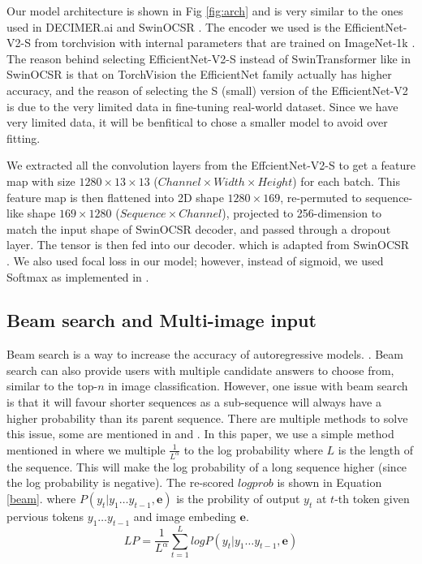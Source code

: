 \documentclass[12pt]{article}
\begin{document}
Our model architecture is shown in Fig \ref{fig:arch} and is very similar to the ones used in DECIMER.ai \autocite{decimer} and SwinOCSR \autocite{swinocsr}. The encoder we used is the EfficientNet-V2-S \autocite{effv2} from torchvision \autocite{torchvision2016} with internal parameters that are trained on ImageNet-1k \autocite{imagenet}. The reason behind selecting EfficientNet-V2-S instead of SwinTransformer like in SwinOCSR \autocite{swinocsr} is that on TorchVision the EfficientNet family actually has higher accuracy, and the reason of selecting the S (small) version of the EfficientNet-V2 is due to the very limited data in fine-tuning real-world dataset. Since we have very limited data, it will be benfitical to chose a smaller model to avoid over fitting. 

We extracted all the convolution layers from the EffcientNet-V2-S to get a feature map with size $1280\times13\times13$ ($Channel \times Width \times Height$)  for each batch. This feature map is then flattened into 2D shape $1280\times169$, re-permuted to sequence-like shape $169\times1280$ ($Sequence \times Channel$), projected to 256-dimension to match the input shape of SwinOCSR decoder, and passed through a dropout layer. The tensor is then fed into our decoder. which is adapted from SwinOCSR \autocite{swinocsr}. We also used focal loss in our model; however, instead of sigmoid, we used Softmax as implemented in \cite{torch_focal}.

\subsection{Beam search and Multi-image input}
Beam search is a way to increase the accuracy of autoregressive models. \autocite{yang_breaking_2018} \autocite{zhang_beam_2024}. Beam search can also provide users with multiple candidate answers to choose from, similar to the top-$n$ in image classification. However, one issue with beam search is that it will favour shorter sequences as a sub-sequence will always have a higher probability than its parent sequence. \autocite{yang_breaking_2018} \autocite{zhang_beam_2024} There are multiple methods to solve this issue, some are mentioned in \autocite{yang_breaking_2018} and \autocite{zhang_beam_2024}. In this paper, we use a simple method mentioned in \autocite{zhang_beam_2024} where we multiple $\frac{1}{L^\alpha}$ to the log probability where $L$ is the length of the sequence. This will make the log probability of a long sequence higher (since the log probability is negative). The re-scored $logprob$ is shown in Equation \ref{beam}.\cite{zhang_beam_2024} where $P(y_t|y_1\dots y_{t-1}, \textbf{e})$ is the probility of output $y_t$ at $t$-th token given pervious tokens $y_1\dots y_{t-1}$ and image embeding $\textbf{e}$. 
\begin{equation}
    LP = \frac{1}{L^{\alpha}}\sum_{t=1}^{L}logP(y_t|y_1\dots y_{t-1}, \textbf{e})
    \label{beam}
\end{equation}
\end{document}
